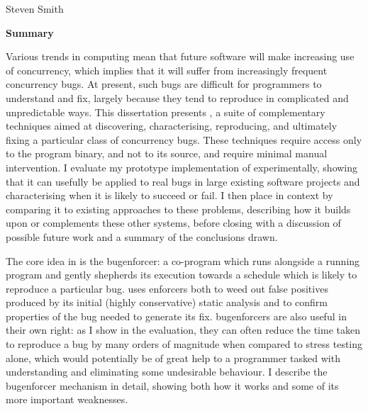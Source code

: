 \cleardoublepage
\begin{center}
\Large \mytitle
\end{center}
\begin{center}
\large Steven Smith
\end{center}
\vspace{10mm}
\begin{center}
\textbf{\large Summary}
\end{center}


\noindent
Various trends in computing mean that future software will make
increasing use of concurrency, which implies that it will suffer from
increasingly frequent concurrency bugs.  At present, such bugs are
difficult for programmers to understand and fix, largely because they
tend to reproduce in complicated and unpredictable ways.  This
dissertation presents {\technique}, a suite of complementary
techniques aimed at discovering, characterising, reproducing, and
ultimately fixing a particular class of concurrency bugs.  These
techniques require access only to the program binary, and not to its
source, and require minimal manual intervention.  I evaluate my
prototype implementation of {\technique} experimentally, showing that
it can usefully be applied to real bugs in large existing software
projects and characterising when it is likely to succeed or fail.  I
then place {\technique} in context by comparing it to existing
approaches to these problems, describing how it builds upon or
complements these other systems, before closing with a discussion of
possible future work and a summary of the conclusions drawn.

The core idea in {\technique} is the \gls{bugenforcer}: a co-program
which runs alongside a running program and gently shepherds its
execution towards a schedule which is likely to reproduce a particular
bug.  {\Technique} uses enforcers both to weed out false positives
produced by its initial (highly conservative) static analysis and to
confirm properties of the bug needed to generate its fix.
\Glspl{bugenforcer} are also useful in their own right: as I show in
the evaluation, they can often reduce the time taken to reproduce a
bug by many orders of magnitude when compared to stress testing alone,
which would potentially be of great help to a programmer tasked with
understanding and eliminating some undesirable behaviour.  I describe
the \gls{bugenforcer} mechanism in detail, showing both how it works
and some of its more important weaknesses.

\vspace*{\fill}

